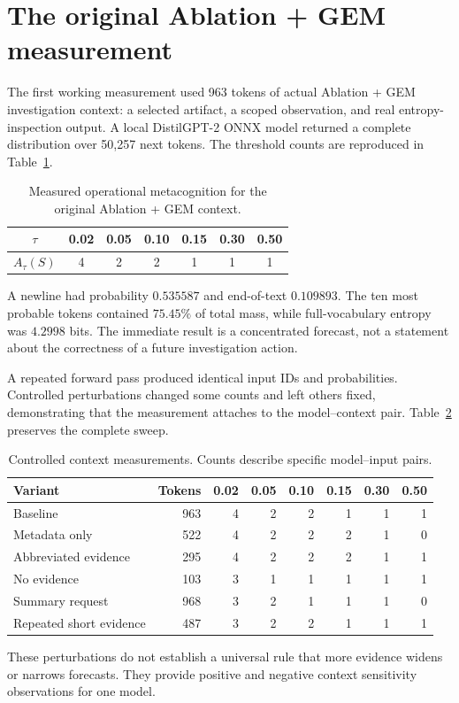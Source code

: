 \section{The original Ablation + GEM measurement}
The first working measurement used 963 tokens of actual Ablation + GEM investigation context: a selected artifact, a scoped observation, and real entropy-inspection output. A local DistilGPT-2 ONNX model returned a complete distribution over 50,257 next tokens. The threshold counts are reproduced in Table~\ref{tab:original-ablation}.
\begin{table}[htbp]
\centering
\caption{Measured operational metacognition for the original Ablation + GEM context.}
\label{tab:original-ablation}
\begin{tabular}{ccccccc}
\toprule
$\tau$ & 0.02 & 0.05 & 0.10 & 0.15 & 0.30 & 0.50\\
\midrule
$A_\tau(S)$ & 4 & 2 & 2 & 1 & 1 & 1\\
\bottomrule
\end{tabular}
\end{table}
A newline had probability $0.535587$ and end-of-text $0.109893$. The ten most probable tokens contained $75.45\%$ of total mass, while full-vocabulary entropy was $4.2998$ bits. The immediate result is a concentrated forecast, not a statement about the correctness of a future investigation action.

A repeated forward pass produced identical input IDs and probabilities. Controlled perturbations changed some counts and left others fixed, demonstrating that the measurement attaches to the model--context pair. Table~\ref{tab:context-perturbation} preserves the complete sweep.
\begin{table}[htbp]
\centering
\caption{Controlled context measurements. Counts describe specific model--input pairs.}
\label{tab:context-perturbation}
{\scriptsize
\begin{tabular}{lrrrrrrr}
\toprule
Variant & Tokens & 0.02 & 0.05 & 0.10 & 0.15 & 0.30 & 0.50\\
\midrule
Baseline &963&4&2&2&1&1&1\\
Metadata only &522&4&2&2&2&1&0\\
Abbreviated evidence &295&4&2&2&2&1&1\\
No evidence &103&3&1&1&1&1&1\\
Summary request &968&3&2&1&1&1&0\\
Repeated short evidence &487&3&2&2&1&1&1\\
\bottomrule
\end{tabular}}
\end{table}
These perturbations do not establish a universal rule that more evidence widens or narrows forecasts. They provide positive and negative context sensitivity observations for one model.

